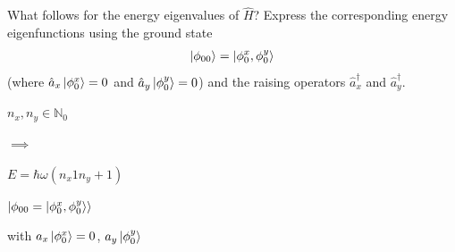 \documentclass[11pt,a4paper]{scrartcl}
\begin{document}
\begin{enumerate}
        What follows for the energy eigenvalues of $\hat{H}$? Express the corresponding energy eigenfunctions using the ground state
        \begin{align*}
            \ket{\phi_{00}} = \ket{\phi_0^x, \phi_0^y}
        \end{align*}
        (where $\hat{a}_x \ket{\phi_0^x} = 0$ and $\hat{a}_y \ket{\phi_0^y} = 0$) and the raising operators $\hat{a}_x^\dagger$ and $\hat{a}_y^\dagger$.
        \begin{calculationbox}
            $n_x, n_y \in \mathbb{N}_0$

            $\implies$

            $E = \hbar \omega (n_x 1 n_y + 1)$
        \end{calculationbox}
        \begin{calculationbox}
            $\ket{\phi_{00} = \ket{\phi_0^x, \phi_0^y}}$        

            with $a_x \ket{\phi_0^x} = 0$, $a_y \ket{\phi_0^y}$
        \end{calculationbox}
    \end{enumerate}
\end{document}
